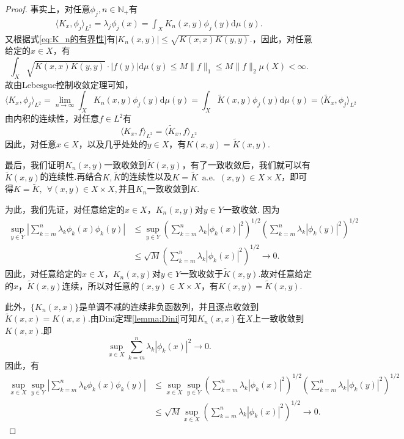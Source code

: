 \documentclass[12pt, a4paper, oneside]{ctexbook}
\begin{document}
\begin{proof}
事实上，对任意$\phi_j,n\in\mathbb{N}_+$有
\begin{align*}
    \langle K_x,\phi_j\rangle_{L^2 } = \lambda_j \phi_j(x) = \int_{X}K_n(x,y)\phi_j(y)\mathrm{d}\mu (y).
\end{align*}
又根据式\eqref{eq:K_n的有界性}有$|K_n(x,y)|\leq \sqrt{K(x,x)K(y,y)}.$，因此，对任意给定的$x\in X$，有
\begin{equation*}
    \int_{X} \sqrt{K(x,x)K(y,y)}\cdot |f(y)|\mathrm{d}\mu(y)\leq M \|f\|_1\leq M\|f\|_2 \mu(X)<\infty.
\end{equation*}
故由Lebesgue控制收敛定理可知，
\begin{equation*}
    \langle K_x,\phi_j\rangle_{L^2} = \lim_{n\to\infty}\int_{X}K_n(x,y)\phi_j(y)\mathrm{d}\mu (y) = \int_{X}\widetilde{K}(x,y)\phi_j(y)\mathrm{d}\mu(y) = \langle \widetilde{K}_x,\phi_j\rangle_{L^2}
\end{equation*}
由内积的连续性，对任意$f\in L^2$有
\begin{equation*}
    \langle K_x,f\rangle_{L^2}=\langle \widetilde{K}_x,f\rangle_{L^2}
\end{equation*}
因此，对任意$x\in X$，以及几乎处处的$y\in X$，有$K(x,y)= \widetilde{K}(x,y).$


最后，我们证明$K_n(x,y)$一致收敛到$\widetilde{K}(x,y)$，有了一致收敛后，我们就可以有$\widetilde{K}(x,y)$的连续性.再结合$K,\widetilde{K}$的连续性以及$K = \widetilde{K}~\operatorname{a.e.} ~(x,y)\in X\times X$，即可得$K=\widetilde{K},~~\forall (x,y)\in X\times X,$并且$K_n$一致收敛到$K.$

为此，我们先证，对任意给定的$x\in X$，$K_n(x,y)$对$y\in Y$一致收敛.
因为
\begin{align*}
    \sup_{y\in Y} |\sum_{k=m}^n \lambda_k\phi_k(x)\phi_k(y)|&\leq \sup_{y\in Y}\left( \sum_{k=m}^n\lambda_k|\phi_k(x)|^2\right)^{1/2}\left( \sum_{k=m}^n\lambda_k|\phi_k(y)|^2\right)^{1/2}\\
    &\leq \sqrt M \left( \sum_{k=m}^n\lambda_k|\phi_k(x)|^2\right)^{1/2}\to 0.
\end{align*}
因此，对任意给定的$x\in X$，$K_n(x,y)$对$y\in Y$一致收敛于$\widetilde{K}(x,y).$故对任意给定的$x$，$\widetilde{K}(x,y)$连续，所以对任意的$(x,y)\in X\times X$，有$K(x,y)=\widetilde{K}(x,y).$

此外，$\{K_n(x,x)\}$是单调不减的连续非负函数列，并且逐点收敛到$\widetilde{K}(x,x)=K(x,x)$.由Dini定理\ref{lemma:Dini}可知$K_n(x,x)$在$X$上一致收敛到$K(x,x).$即
\begin{equation*}
    \sup_{x\in X}\sum_{k=m}^n \lambda_k|\phi_k(x)|^2\to 0.
\end{equation*}
因此，有
\begin{align*}
    \sup_{x\in X}\sup_{y\in Y} |\sum_{k=m}^n \lambda_k\phi_k(x)\phi_k(y)|&\leq \sup_{x\in X}\sup_{y\in Y}\left( \sum_{k=m}^n\lambda_k|\phi_k(x)|^2\right)^{1/2}\left( \sum_{k=m}^n\lambda_k|\phi_k(y)|^2\right)^{1/2}\\
    &\leq \sqrt M \sup_{x\in X}\left( \sum_{k=m}^n\lambda_k|\phi_k(x)|^2\right)^{1/2}\to 0.
\end{align*}
\end{proof}
\end{document}

